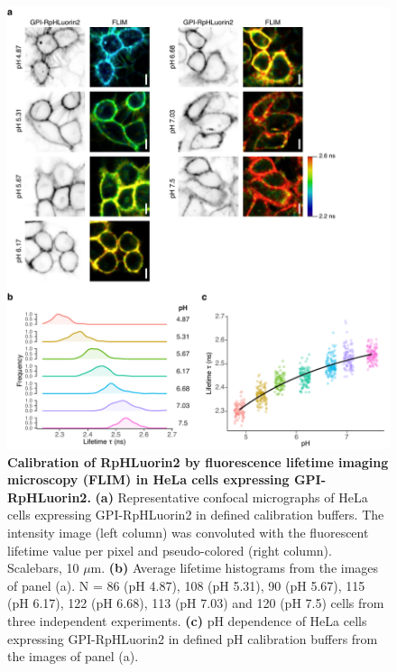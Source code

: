 \begin{figure}
    \includegraphics[keepaspectratio=true,width=\textwidth,height=\textheight]{chapters/chapter3/chapter3_Figure2.pdf}
    \caption{\textbf{Calibration of RpHLuorin2 by fluorescence lifetime imaging microscopy (FLIM) in HeLa cells expressing GPI-RpHLuorin2.} \textbf{(a)} Representative confocal micrographs of HeLa cells expressing GPI-RpHLuorin2 in defined calibration buffers. The intensity image (left column) was convoluted with the fluorescent lifetime value per pixel and pseudo-colored (right column). Scalebars, 10 $\mu$m. \textbf{(b)} Average lifetime histograms from the images of panel (a). N = 86 (pH 4.87), 108 (pH 5.31), 90 (pH 5.67), 115 (pH 6.17), 122 (pH 6.68), 113 (pH 7.03) and 120 (pH 7.5) cells from three independent experiments. \textbf{(c)} pH dependence of HeLa cells expressing GPI-RpHLuorin2 in defined pH calibration buffers from the images of panel (a).}
    \label{fig:ch3fig2}
\end{figure}


